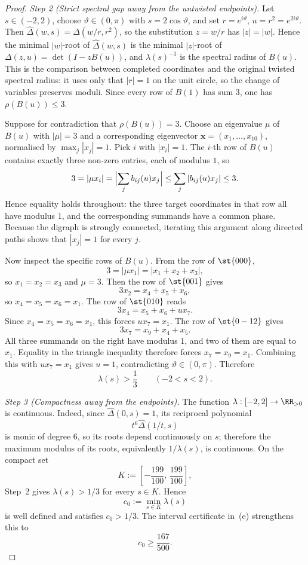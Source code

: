 \begin{proof}
\medskip
\noindent\textit{Step 2 (Strict spectral gap away from the untwisted
endpoints).}\quad
Let \(s\in(-2,2)\), choose \(\vartheta\in(0,\pi)\) with
\(s=2\cos\vartheta\), and set \(r=e^{i\vartheta}\), \(u=r^2=e^{2i\vartheta}\).
Then \(\widehat\Delta(w,s)=\Delta(w/r,r^2)\), so
the substitution \(z=w/r\) has \(|z|=|w|\). Hence the minimal
\(|w|\)-root of \(\widehat\Delta(w,s)\) is the minimal \(|z|\)-root of
\(\Delta(z,u)=\det(I-zB(u))\), and \(\lambda(s)^{-1}\) is the spectral
radius of \(B(u)\). This is the comparison between completed
coordinates and the original twisted spectral radius: it uses only that
\(|r|=1\) on the unit circle, so the change of variables preserves
moduli. Since every row
of \(B(1)\) has sum \(3\), one has \(\rho(B(u))\le 3\).

Suppose for contradiction that \(\rho(B(u))=3\). Choose an eigenvalue
\(\mu\) of \(B(u)\) with \(|\mu|=3\) and a corresponding eigenvector
\(\mathbf{x}=(x_1,\dots,x_{10})\), normalised by
\(\max_j |x_j|=1\). Pick \(i\) with \(|x_i|=1\). The \(i\)-th row of
\(B(u)\) contains exactly three non-zero entries, each of modulus \(1\),
so
\[
  3=|\mu x_i|
   =\Bigl|\sum_j b_{ij}(u)x_j\Bigr|
  \le \sum_j |b_{ij}(u)x_j|
  \le 3.
\]
Hence equality holds throughout: the three target coordinates in that
row all have modulus \(1\), and the corresponding summands have a
common phase. Because the digraph is strongly connected, iterating this
argument along directed paths shows that \(|x_j|=1\) for every
\(j\).

Now inspect the specific rows of \(B(u)\). From the row of
\(\st{000}\),
\[
  3=|\mu x_1|=|x_1+x_2+x_3|,
\]
so \(x_1=x_2=x_3\) and \(\mu=3\). Then the row of
\(\st{001}\) gives
\[
  3x_2=x_4+x_5+x_6,
\]
so \(x_4=x_5=x_6=x_1\). The row of \(\st{010}\) reads
\[
  3x_4=x_5+x_6+ux_7.
\]
Since \(x_4=x_5=x_6=x_1\), this forces \(ux_7=x_1\). The row of
\(\st{0-12}\) gives
\[
  3x_7=x_9+x_4+x_5.
\]
All three summands on the right have modulus \(1\), and two of them
are equal to \(x_1\). Equality in the triangle inequality therefore
forces \(x_7=x_9=x_1\). Combining this with \(ux_7=x_1\) gives
\(u=1\), contradicting \(\vartheta\in(0,\pi)\). Therefore
\[
  \lambda(s)>\frac13
  \qquad (-2<s<2).
\]

\medskip
\noindent\textit{Step 3 (Compactness away from the endpoints).}\quad
The function \(\lambda:[-2,2]\to\RR_{>0}\) is continuous. Indeed, since
\(\widehat\Delta(0,s)=1\), its reciprocal polynomial
\[
  t^6\widehat\Delta(1/t,s)
\]
is monic of degree \(6\), so its roots depend continuously on \(s\);
therefore the maximum modulus of its roots, equivalently \(1/\lambda(s)\),
is continuous. On the compact
set
\[
  K:=\left[-\frac{199}{100},\,\frac{199}{100}\right],
\]
Step~2 gives \(\lambda(s)>1/3\) for every \(s\in K\). Hence
\[
  c_0:=\min_{s\in K}\lambda(s)
\]
is well defined and satisfies \(c_0>1/3\).
The interval certificate in
\,\textup{(e)} strengthens this to
\[
  c_0\ge\frac{167}{500}.
\]


\end{proof}
